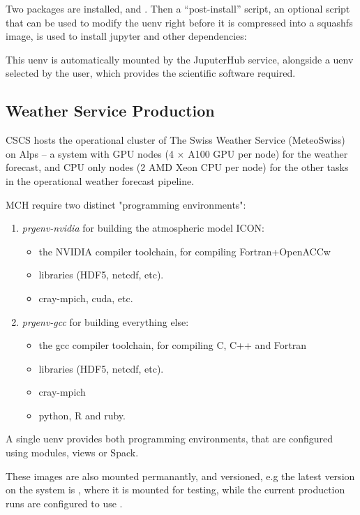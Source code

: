 Two packages are installed,  and .
Then a ``post-install'' script, an optional script that can be used to modify the uenv right before it is compressed into a squashfs image, is used to install jupyter and other dependencies:



This uenv is automatically mounted by the JuputerHub service, alongside a uenv selected by the user, which provides the scientific software required.

\subsection{Weather Service Production}

CSCS hosts the operational cluster of The Swiss Weather Service (MeteoSwiss) on Alps -- a system with GPU nodes (4 $\times$ A100 GPU per node) for the weather forecast, and CPU only nodes (2 AMD Xeon CPU per node) for the other tasks in the operational weather forecast pipeline.

MCH require two distinct "programming environments":
\begin{enumerate}
    \item \emph{prgenv-nvidia} for building the atmospheric model ICON:
    \begin{itemize}
        \item the NVIDIA compiler toolchain, for compiling Fortran+OpenACCw
        \item libraries (HDF5, netcdf, etc).
        \item cray-mpich, cuda, etc.
    \end{itemize}
    \item \emph{prgenv-gcc} for building everything else:
    \begin{itemize}
        \item the gcc compiler toolchain, for compiling C, C++ and Fortran
        \item libraries (HDF5, netcdf, etc).
        \item cray-mpich
        \item python, R and ruby.
    \end{itemize}
\end{enumerate}
A single uenv provides both programming environments, that are configured using modules, views or Spack.

These images are also mounted permanantly, and versioned, e.g the latest version on the system is , where it is mounted for testing, while the current production runs are configured to use .

